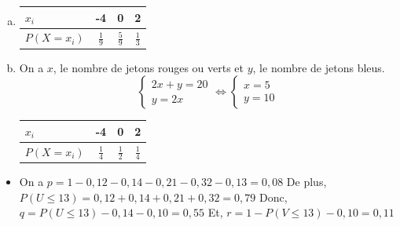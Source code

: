 \documentclass[12pt, a4paper]{article}
\begin{document}
    \begin{Exercise}[number={36}]
      \begin{enumerate}[a)]
        \item \hfill\begin{tabular}[t]{ | l || *{3}{c| } } \firsthline      
                $x_i$                     & -4            & 0             & 2             \\ \hline
                $P(X=x_i)$ \hspace{0.5cm} & $\frac{1}{9}$ & $\frac{5}{9}$ & $\frac{1}{3}$ \\ \hline
              \end{tabular}\hfill\mbox{}\medbreak
              \parbox{\linewidth}{}

        \item On a $x$, le nombre de jetons rouges ou verts et $y$, le nombre de jetons bleus.
              \begin{equation*}
                \begin{cases}2x+y=20\\y=2x\end{cases}\iff\begin{cases}x=5\\y=10\end{cases}
              \end{equation*} \medbreak
              \begin{center}\begin{tabular}{ | l || *{3}{c| } }
                \hline
                $x_i$                     & -4            & 0             & 2             \\ \hline
                $P(X=x_i)$ \hspace{0.5cm} & $\frac{1}{4}$ & $\frac{1}{2}$ & $\frac{1}{4}$ \\ \hline
              \end{tabular}\end{center}
              \parbox{\linewidth}{}

      \end{enumerate}
    \end{Exercise}

    \clearpage

    \begin{Exercise}[number={39}]
      \begin{itemize}
        \item[] On a $p=1-0{,}12-0{,}14-0{,}21-0{,}32-0{,}13=0{,}08$ \medbreak
                De plus, $P(U\leq 13)=0{,}12+0{,}14+0{,}21+0{,}32=0{,}79$ \medbreak
                Donc, $q=P(U\leq 13)-0{,}14-0{,}10=0{,}55$ \medbreak
                Et, $r=1-P(V\leq 13)-0{,}10=0{,}11$
      \end{itemize}
    \end{Exercise}
\end{document}
